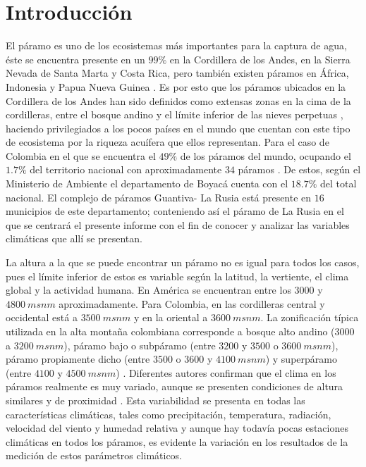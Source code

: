 \documentclass[conference,final,]{IEEEtran}
\begin{document}
\hypertarget{introducciuxf3n}{%
\section{Introducción}\label{introducciuxf3n}}

El páramo es uno de los ecosistemas más importantes para la captura de
agua, éste se encuentra presente en un \(99 \%\) en la Cordillera de los
Andes, en la Sierra Nevada de Santa Marta y Costa Rica, pero también
existen páramos en África, Indonesia y Papua Nueva Guinea
\citep{cabrera}. Es por esto que los páramos ubicados en la Cordillera de
los Andes han sido definidos como extensas zonas en la cima de la
cordilleras, entre el bosque andino y el límite inferior de las nieves
perpetuas \citep{cabrera}, haciendo privilegiados a los pocos países en
el mundo que cuentan con este tipo de ecosistema por la riqueza acuífera
que ellos representan. Para el caso de Colombia en el que se encuentra
el \(49 \%\) de los páramos del mundo, ocupando el \(1.7 \%\) del
territorio nacional con aproximadamente \(34\) páramos \citep{cabrera}.
De estos, según el Ministerio de Ambiente el departamento de Boyacá
cuenta con el \(18.7 \%\) del total nacional. El complejo de páramos
Guantiva- La Rusia está presente en \(16\) municipios de este
departamento; conteniendo así el páramo de La Rusia en el que se
centrará el presente informe con el fin de conocer y analizar las
variables climáticas que allí se presentan.

La altura a la que se puede encontrar un páramo no es igual para todos
los casos, pues el límite inferior de estos es variable según la
latitud, la vertiente, el clima global y la actividad humana. En América
se encuentran entre los \(3000\) y \(4800 \ msnm\) aproximadamente. Para
Colombia, en las cordilleras central y occidental está a \(3500 \ msnm\)
y en la oriental a \(3600 \ msnm\). La zonificación típica utilizada en
la alta montaña colombiana corresponde a bosque alto andino (\(3000\) a
\(3200 \ msnm\)), páramo bajo o subpáramo (entre \(3200\) y \(3500\) o
\(3600 \ msnm\)), páramo propiamente dicho (entre \(3500\) o \(3600\) y
\(4100 \ msnm\)) y superpáramo (entre \(4100\) y \(4500 \ msnm\))
\citep{ortizparamos}. Diferentes autores confirman que el clima en los
páramos realmente es muy variado, aunque se presenten condiciones de
altura similares y de proximidad \citep{paramos}. Esta variabilidad se
presenta en todas las características climáticas, tales como
precipitación, temperatura, radiación, velocidad del viento y humedad
relativa y aunque hay todavía pocas estaciones climáticas en todos los
páramos, es evidente la variación en los resultados de la medición de
estos parámetros climáticos.
\end{document}
